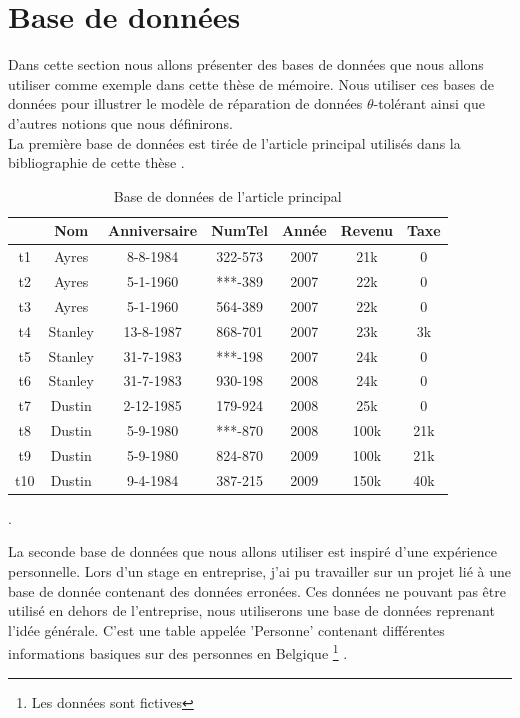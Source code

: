 \documentclass[letterpaper, 12pt]{report}
\theoremstyle{definition}
\newcommand{\alinea}{
\hspace*{0.5cm}}
\begin{document}
\section{Base de données}

\alinea Dans cette section nous allons présenter des bases de données que nous allons utiliser comme exemple dans cette thèse de mémoire. Nous utiliser ces bases de données pour illustrer le modèle de réparation de données $\theta$-tolérant ainsi que d'autres notions que nous définirons.\\

La première base de données est tirée de l'article principal utilisés dans la bibliographie de cette thèse \cite{main}.

\begin{table}[H]
	\centering
	\begin{tabular}{|c|c c c c c c|}
	\hline
	    & Nom & Anniversaire & NumTel & Année & Revenu & Taxe\\
	\hline
	 t1 & Ayres & 8-8-1984 & 322-573 & 2007 & 21k & 0\\
	 t2 & Ayres & 5-1-1960 & ***-389 & 2007 & 22k & 0 \\
	 t3 & Ayres & 5-1-1960 & 564-389 & 2007 & 22k & 0 \\
	 t4 & Stanley & 13-8-1987 & 868-701 & 2007 & 23k & 3k\\
	 t5 & Stanley & 31-7-1983 & ***-198 & 2007 & 24k & 0\\
	 t6 & Stanley & 31-7-1983 & 930-198 & 2008 & 24k & 0\\
	 t7 & Dustin & 2-12-1985 & 179-924 & 2008 & 25k & 0 \\
	 t8 & Dustin & 5-9-1980 & ***-870 & 2008 & 100k & 21k \\
	 t9 & Dustin & 5-9-1980 & 824-870 & 2009 & 100k & 21k \\
	 t10 & Dustin & 9-4-1984 & 387-215 & 2009 & 150k & 40k \\
	 \hline
	\end{tabular}
	\caption{\label{tableMain} Base de données de l'article principal \cite{main}}.
\end{table}

La seconde base de données que nous allons utiliser est inspiré d'une expérience personnelle. Lors d'un stage en entreprise, j'ai pu travailler sur un projet lié à une base de donnée contenant des données erronées. Ces données ne pouvant pas être utilisé en dehors de l'entreprise, nous utiliserons une base de données reprenant l'idée générale. C'est une table appelée 'Personne' contenant différentes informations basiques sur des personnes en Belgique \footnote{Les données sont fictives} . 
\end{document}

